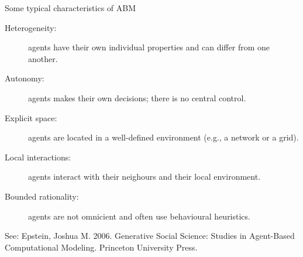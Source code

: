 \documentclass[table, 14pt, aspectratio=169]{beamer}
\begin{document}
\begin{frame}[t]
\begin{columns}[T]
  \end{columns}
\end{frame}

\begin{frame}{Some typical characteristics of ABM}
  \small
  \begin{description}
    \item [Heterogeneity:] agents have their own individual properties and can differ from one another.
    \item [Autonomy:] agents makes their own decisions; there is no central control.
    \item [Explicit space:] agents are located in a well-defined environment (e.g., a network or a grid).
    \item [Local interactions:] agents interact with their neighours and their local environment.
    \item [Bounded rationality:] agents are not omnicient and often use behavioural heuristics.
  \end{description}
  \vfill
  \tiny See: Epstein, Joshua M. 2006. Generative Social Science: Studies in Agent-Based Computational Modeling. Princeton University Press.
\end{frame}

\end{document}
